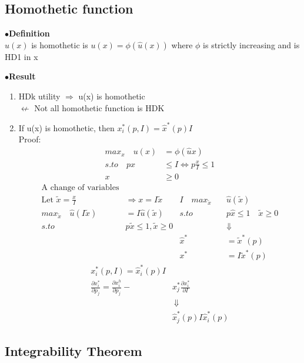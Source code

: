 \documentclass[letterpaper,13pt,single,pdftex]{scrartcl}
\begin{document}
\subsection{Homothetic function}
$\bullet$\textbf{Definition}\\
 $u(x)$ is homothetic is $u(x) = \phi(\hat{u}(x))$ where $\phi$ is strictly increasing and  is HD1 in x

$\bullet$\textbf{Result}
\begin{enumerate}
    \item 
    HDk utility $\Rightarrow$ u(x) is homothetic\\ 
    $\not\leftarrow$ Not all homothetic function is HDK
    \item
 If u(x) is homothetic, then $ x_i^*(p,I) = \hat{x}^*(p)I$\\
 Proof:\begin{align*}
     max_x \quad u(x) &= \phi (\hat{u}x)\\
     s.to \quad px&\le I \Leftrightarrow p\frac{x}{I} \le 1\\
     x &\ge 0
 \end{align*}
 \begin{align*}
     \text{A change of variables}&\\
     \text{Let }\tilde{x} = \frac{x}{I}& \Rightarrow x= I \tilde{x} &  I \quad max_{\tilde{x}} \quad & \hat{u}(\tilde{x})\\
     max_{\tilde{x}}\quad \hat{u}(I\tilde{x}) &= I \hat{u}(\tilde{x}) & s.to\quad &p\hat{x} \le 1 \quad \tilde{x}\ge 0\\
     s.to \quad &p\tilde{x}\le 1, \tilde{x}\ge 0 & &\Downarrow \\
     &&\hat{x}^* &= \tilde{x}^*(p
     )\\
     &&x^*& = I\tilde{x}^*(p)
 \end{align*}
   \begin{align*}
        x_i^*(p,I) = \hat{x}_i^*(p)I &\\
        \frac{\partial x_i^*}{\partial p_j} = \frac{\partial x^h_i}{\partial p_j} - &x_j^* \frac{\partial x_i^*}{\partial I}\\
        &\,\Downarrow\\
        &\hat{x}_j^*(p)I\hat{x}_i^*(p)
    \end{align*}
\end{enumerate}

\subsection{Integrability Theorem}
\end{document}
